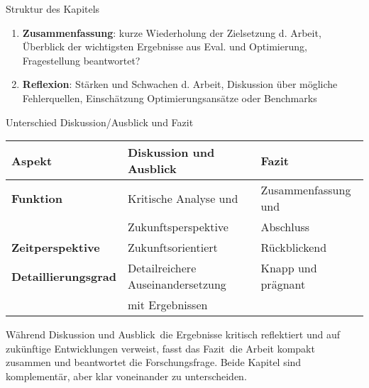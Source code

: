 \begin{tcolorbox}[
	enhanced,
	colback=red!5!white,
	colframe=red!75!black!50,
	title= Mein roter Faden
	]
	Struktur des Kapitels
	
	\begin{enumerate}
		\item \textbf{Zusammenfassung}: kurze Wiederholung der Zielsetzung d. Arbeit, Überblick der wichtigsten Ergebnisse aus Eval. und Optimierung, Fragestellung beantwortet?
		\item \textbf{Reflexion}: Stärken und Schwachen d. Arbeit, Diskussion über mögliche  Fehlerquellen, Einschätzung Optimierungsansätze oder Benchmarks
	\end{enumerate}
\end{tcolorbox}

\begin{tcolorbox}[
	enhanced,
	colback=red!5!white,
	colframe=red!75!black!50,
	title= Mein roter Faden
	]
	Unterschied Diskussion/Ausblick und Fazit\vspace{0.2cm}
	
	\begin{tabular}{|l|l|l|}
		\hline
		\textbf{Aspekt} & \textbf{Diskussion und Ausblick} & \textbf{Fazit} \\
		\hline
		\textbf{Funktion} & Kritische Analyse und & Zusammenfassung und \\
		& Zukunftsperspektive & Abschluss \\
		\hline
		\textbf{Zeitperspektive} & Zukunftsorientiert & Rückblickend \\
		\hline
		\textbf{Detaillierungsgrad} & Detailreichere Auseinandersetzung & Knapp und prägnant \\
		&  mit Ergebnissen & \\
		\hline
	\end{tabular}\vspace{0.2cm}
	
	Während \glqq Diskussion und Ausblick\grqq \ die Ergebnisse kritisch reflektiert und auf zukünftige Entwicklungen verweist, fasst das \glqq Fazit\grqq \ die Arbeit kompakt zusammen und beantwortet die Forschungsfrage. Beide Kapitel sind komplementär, aber klar voneinander zu unterscheiden.
\end{tcolorbox}
